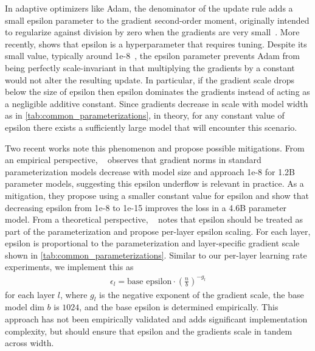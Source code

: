 \documentclass{article}
\theoremstyle{plain}
\theoremstyle{definition}
\theoremstyle{remark}
\begin{document}
In adaptive optimizers like Adam, the denominator of the update rule adds a small epsilon parameter to the gradient second-order moment, originally intended to regularize against division by zero when the gradients are very small~\citep{duchi2011adaptive,hinton2012neural}. More recently, \citet{choi2019empirical} shows that epsilon is a hyperparameter that requires tuning. Despite its small value, typically around 1e-8~\citep{paszke2019pytorch,deepmind2020jax}, the epsilon parameter prevents Adam from being perfectly scale-invariant in that multiplying the gradients by a constant would not alter the resulting update. In particular, if the gradient scale drops below the size of epsilon then epsilon dominates the gradients instead of acting as a negligible additive constant. Since gradients decrease in scale with model width as in \cref{tab:common_parameterizations}, in theory, for any constant value of epsilon there exists a sufficiently large model that will encounter this scenario.







Two recent works note this phenomenon and propose possible mitigations. From an empirical perspective, ~\citet{wortsman2023small} observes that gradient norms in standard parameterization models decrease with model size and approach 1e-8 for 1.2B parameter models, suggesting this epsilon underflow is relevant in practice. As a mitigation, they propose using a smaller constant value for epsilon and show that decreasing epsilon from 1e-8 to 1e-15 improves the loss in a 4.6B parameter model. From a theoretical perspective, ~\citet{yang2023tensorivb} notes that epsilon should be treated as part of the parameterization and propose per-layer epsilon scaling. For each layer, epsilon is proportional to the parameterization and layer-specific gradient scale shown in \cref{tab:common_parameterizations}. Similar to our per-layer learning rate experiments, we implement this as
\begingroup
\setlength{\abovedisplayskip}{4pt}
\setlength{\belowdisplayskip}{6pt}
\begin{align*}
    \epsilon_l = \textrm{base epsilon} \cdot (\frac{n}{b})^{-g_l}
\end{align*}
\endgroup
for each layer $l$, where $g_l$ is the negative exponent of the gradient scale, the base model dim $b$ is $1024$, and the base epsilon is determined empirically. This approach has not been empirically validated and adds significant implementation complexity, but should ensure that epsilon and the gradients scale in tandem across width.
\end{document}
